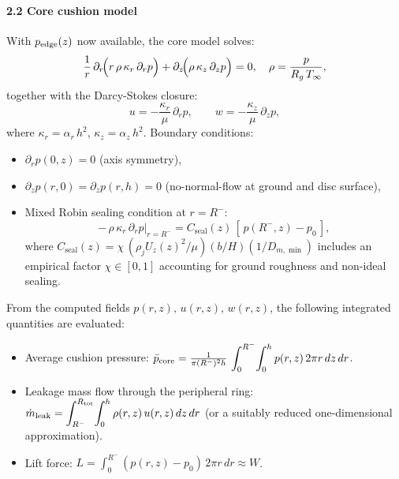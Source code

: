 \documentclass[11pt,a4paper]{article}
\begin{document}
\paragraph{2.2 Core cushion model}  
With \(p_{\rm edge}(z)\) now available, the core model solves:
\[
  \frac{1}{r}\,\partial_r\!\Bigl(r\,\rho\,\kappa_r\,\partial_r p\Bigr)
  + \partial_z\!\Bigl(\rho\,\kappa_z\,\partial_z p\Bigr) = 0,
  \quad
  \rho = \frac{p}{R_g\,T_\infty}, 
\]
together with the Darcy-Stokes closure:
\[
  u = -\frac{\kappa_r}{\mu}\,\partial_r p,
  \qquad
  w = -\frac{\kappa_z}{\mu}\,\partial_z p,
\]
where \(\kappa_r=\alpha_r\,h^2\), \(\kappa_z=\alpha_z\,h^2\).  
Boundary conditions:
\begin{itemize}
  \item \(\partial_r p(0,z)=0\) (axis symmetry),
  \item \(\partial_z p(r,0)=\partial_z p(r,h)=0\) (no-normal-flow at ground and disc surface),
  \item Mixed Robin sealing condition at \(r=R^{-}\):
  \[
    -\,\rho\,\kappa_r\,\partial_r p\big|_{r=R^{-}}
    = C_{\mathrm{seal}}(z)\,[\,p(R^{-},z)-p_0\,],
  \]
  where \(C_{\mathrm{seal}}(z)=\chi\,(\rho_j U_z(z)^2/\mu)(b/H)(1/D_{m,\min})\)
  includes an empirical factor \(\chi\in[0,1]\) accounting for ground roughness and non-ideal sealing.
\end{itemize}
From the computed fields \(p(r,z),\,u(r,z),\,w(r,z)\), the following integrated quantities are evaluated:
\begin{itemize}
  \item Average cushion pressure: \(\bar p_{\rm core} = \frac{1}{\pi (R^{-})^2 h}\,\displaystyle\int_0^{R^{-}}\!\int_0^h p(r,z)\,2\pi r\,dz\,dr\).
  \item Leakage mass flow through the peripheral ring: \(\dot m_{\rm leak} = \displaystyle\int_{R^{-}}^{R_{\rm tot}}\!\int_0^{h}\rho(r,z)\,u(r,z)\,dz\,dr\) (or a suitably reduced one-dimensional approximation).
  \item Lift force: \( L = \displaystyle\int_{0}^{R^{-}}\!\! (p(r,z)-p_0)\,2\pi r\,dr \approx W \).
\end{itemize}
\end{document}
